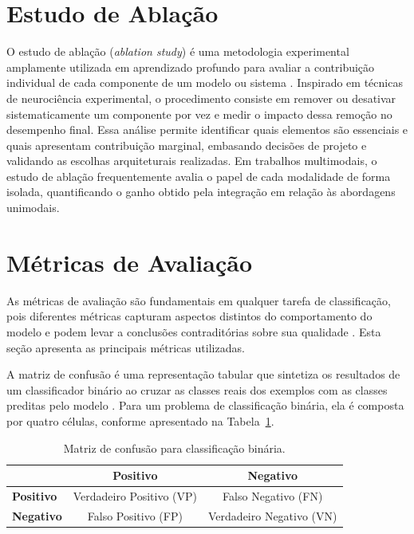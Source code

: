 \section{Estudo de Ablação}

O estudo de ablação (\textit{ablation study}) é uma metodologia experimental amplamente utilizada em aprendizado profundo para avaliar a contribuição individual de cada componente de um modelo ou sistema \cite{meyes2019}. Inspirado em técnicas de neurociência experimental, o procedimento consiste em remover ou desativar sistematicamente um componente por vez e medir o impacto dessa remoção no desempenho final. Essa análise permite identificar quais elementos são essenciais e quais apresentam contribuição marginal, embasando decisões de projeto e validando as escolhas arquiteturais realizadas. Em trabalhos multimodais, o estudo de ablação frequentemente avalia o papel de cada modalidade de forma isolada, quantificando o ganho obtido pela integração em relação às abordagens unimodais.

\section{Métricas de Avaliação}

As métricas de avaliação são fundamentais em qualquer tarefa de classificação, pois diferentes métricas capturam aspectos distintos do comportamento do modelo e podem levar a conclusões contraditórias sobre sua qualidade \cite{sokolova2009}. Esta seção apresenta as principais métricas utilizadas.

A matriz de confusão é uma representação tabular que sintetiza os resultados de um classificador binário ao cruzar as classes reais dos exemplos com as classes preditas pelo modelo \cite{fawcett2006}. Para um problema de classificação binária, ela é composta por quatro células, conforme apresentado na Tabela~\ref{tab:confusion_matrix}.
 
\begin{table}[ht]
\centering
\caption{Matriz de confusão para classificação binária.}
\label{tab:confusion_matrix}
\begin{tabular}{lcc}
\hline
 & \textbf{Positivo} & \textbf{Negativo} \\
\hline
\textbf{Positivo} & Verdadeiro Positivo (VP) & Falso Negativo (FN) \\
\textbf{Negativo} & Falso Positivo (FP) & Verdadeiro Negativo (VN) \\
\hline
\end{tabular}
\end{table}
 

